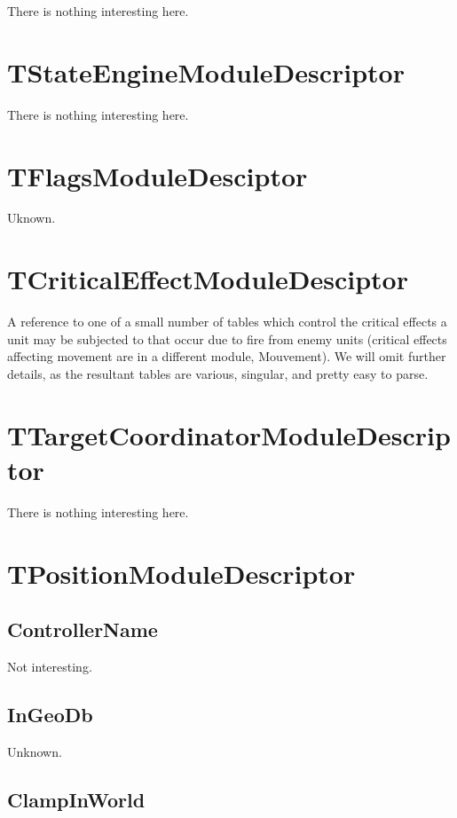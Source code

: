 \documentclass{article}
\begin{document}
There is nothing interesting here.

\section{TStateEngineModuleDescriptor}

There is nothing interesting here.

\section{TFlagsModuleDesciptor}

Uknown.

\section{TCriticalEffectModuleDesciptor}

A reference to one of a small number of tables which control the critical effects a unit may be subjected to that occur due to fire from enemy units (critical effects affecting movement are in a different module, Mouvement). We will omit further details, as the resultant tables are various, singular, and pretty easy to parse.

\section{TTargetCoordinatorModuleDescriptor}

There is nothing interesting here.

\section{TPositionModuleDescriptor}

\subsection{ControllerName}

Not interesting.

\subsection{InGeoDb}

Unknown.

\subsection{ClampInWorld}
\end{document}
